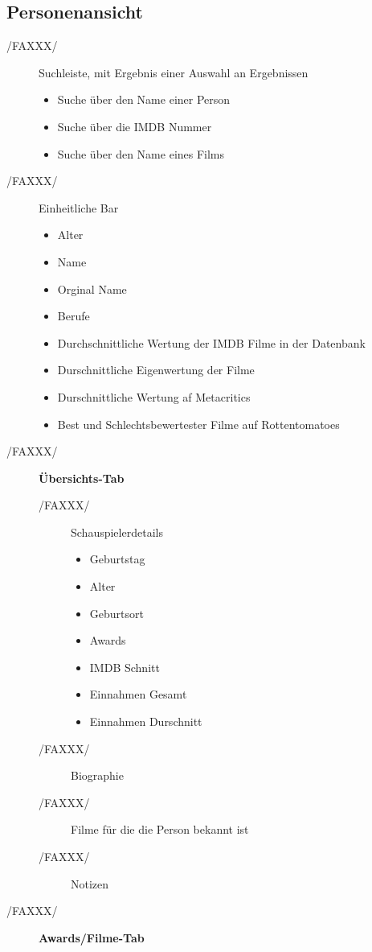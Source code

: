 \newpage
\subsection{Personenansicht}
\begin{description}
	\item[/FAXXX/] Suchleiste, mit Ergebnis einer Auswahl an Ergebnissen
	\begin{itemize}
		\item Suche über den Name einer Person
		\item Suche über die IMDB Nummer
		\item Suche über den Name eines Films
	\end{itemize}
	\item[/FAXXX/] Einheitliche Bar
	\begin{itemize}
		\item Alter
		\item Name
		\item Orginal Name
		\item Berufe
		\item Durchschnittliche Wertung der IMDB Filme in der Datenbank
		\item Durschnittliche Eigenwertung der Filme 
		\item Durschnittliche Wertung af Metacritics
		\item Best und Schlechtsbewertester Filme auf Rottentomatoes
	\end{itemize}
	\item[/FAXXX/] \textbf{Übersichts-Tab}
	\begin{description}
		\item[/FAXXX/] Schauspielerdetails
		\begin{itemize}
			\item Geburtstag
			\item Alter
			\item Geburtsort
			\item Awards
			\item IMDB Schnitt
			\item Einnahmen Gesamt
			\item Einnahmen Durschnitt
		\end{itemize}
		\item[/FAXXX/] Biographie
		\item[/FAXXX/] Filme für die die Person bekannt ist
		\item[/FAXXX/] Notizen
	\end{description}	
	\item[/FAXXX/] \textbf{Awards/Filme-Tab}

\end{description}

